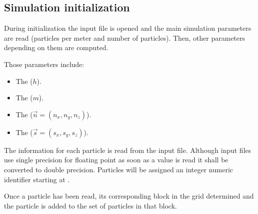 \subsection{Simulation initialization}

During initialization the input file is opened and the main simulation
parameters are read (particles per meter and number of particles).
Then, other parameters depending on them are computed.

Those parameters include:
\begin{itemize}
\item The  ($h$).
\item The  ($m$).
\item The  ($\vec{n} = (n_x, n_y, n_z)$).
\item The  ($\vec{s} = (s_x, s_y, s_z)$).
\end{itemize}

The information for each particle is read from the input file. Although
input files use single precision for floating point as soon as a value is 
read it shall be converted to double precision.
Particles will be assigned an integer numeric identifier starting at .

Once a particle has been read, its corresponding block in the grid determined
and the particle is added to the set of particles in that block. 
